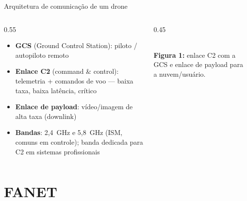 \documentclass[aspectratio=169,11pt]{beamer}
\begin{document}
\begin{frame}{Arquitetura de comunicação de um drone}
  \begin{columns}
    \begin{column}{0.55\textwidth}
      \begin{itemize}
        \item \textbf{GCS} (Ground Control Station): piloto / autopiloto remoto
        \item \textbf{Enlace C2} (command \& control): telemetria + comandos de voo --- baixa taxa, baixa latência, crítico
        \item \textbf{Enlace de payload}: vídeo/imagem de alta taxa (downlink)
        \item \textbf{Bandas}: 2,4~GHz e 5,8~GHz (ISM, comuns em controle); banda dedicada para C2 em sistemas profissionais
      \end{itemize}
    \end{column}
    \begin{column}{0.45\textwidth}
      \begin{center}
        \\[1mm] {\scriptsize \textbf{Figura 1:} enlace C2 com a GCS e enlace de payload para a nuvem/usuário.}
      \end{center}
    \end{column}
  \end{columns}
\end{frame}

\section{FANET}
\end{document}
